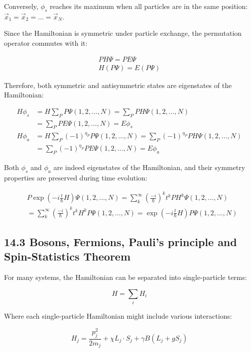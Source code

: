 \documentclass[10pt]{article}
\begin{document}
Conversely, $\phi_s$ reaches its maximum when all particles are in the same position: $\vec{x}_1=\vec{x}_2=\ldots=\vec{x}_N$.

Since the Hamiltonian is symmetric under particle exchange, the permutation operator commutes with it:

\begin{gather*}
PH\Psi=PE\Psi\\
H(P\Psi)=E(P\Psi) \tag{14.14}
\end{gather*}

Therefore, both symmetric and antisymmetric states are eigenstates of the Hamiltonian:

\begin{align*}
H\phi_s&=H\sum_P P\Psi(1,2,\ldots,N)=\sum_P PH\Psi(1,2,\ldots,N)\\
&=\sum_P PE\Psi(1,2,\ldots,N)=E\phi_s \tag{14.15}\\
H\phi_a&=H\sum_P(-1)^{\eta_P}P\Psi(1,2,\ldots,N)=\sum_P(-1)^{\eta_P}PH\Psi(1,2,\ldots,N)\\
&=\sum_P(-1)^{\eta_P}PE\Psi(1,2,\ldots,N)=E\phi_a \tag{14.16}
\end{align*}


Both $\phi_s$ and $\phi_a$ are indeed eigenstates of the Hamiltonian, and their symmetry properties are preserved during time evolution:

\begin{align*}
&P\exp(-i\frac{t}{\hbar}H)\Psi(1,2,\ldots,N)=\sum_{k}^{\infty}(\frac{-i}{\hbar})^k t^k PH^k\Psi(1,2,\ldots,N)\\
&=\sum_{k}^{\infty}(\frac{-i}{\hbar})^k t^k H^kP\Psi(1,2,\ldots,N)=\exp(-i\frac{t}{\hbar}H)P\Psi(1,2,\ldots,N) \tag{14.17}
\end{align*}

\subsection*{14.3 Bosons, Fermions, Pauli's principle and Spin-Statistics Theorem}
For many systems, the Hamiltonian can be separated into single-particle terms:

\begin{equation*}
H=\sum_i H_i \tag{14.18}
\end{equation*}

Where each single-particle Hamiltonian might include various interactions:

\begin{equation*}
H_j=\frac{p_j^2}{2m_j}+\chi L_j\cdot S_j+\gamma B(L_j+gS_j) \tag{14.19}
\end{equation*}
\end{document}
